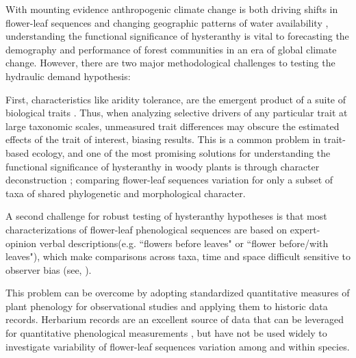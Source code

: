 \documentclass{article}\usepackage[]{graphicx}\usepackage[]{color}
\begin{document}

\noindent With mounting evidence anthropogenic climate change is both driving shifts in flower-leaf sequences \citep{Ma2020:aa} and changing geographic patterns of water availability \citep{Overpeck11856}, understanding the functional significance of hysteranthy is vital to forecasting the demography and performance of forest communities in an era of global climate change. However, there are two major methodological challenges to testing the hydraulic demand hypothesis:

\noindent First, characteristics like aridity tolerance, are the emergent product of a suite of biological traits \citep{Simova:2017vk}. Thus, when analyzing selective drivers of any particular trait at large taxonomic scales, unmeasured trait differences may obscure the estimated effects of the trait of interest, biasing results. %
This is a common problem in trait-based ecology, and one of the most promising solutions for understanding the functional significance of hysteranthy in woody plants is through character deconstruction \citep{Terribile2009}; comparing flower-leaf sequences variation for only a subset of taxa of shared phylogenetic and morphological character.   

\noindent A second challenge for robust testing of hysteranthy hypotheses is that most characterizations of flower-leaf phenological sequences are based on expert-opinion verbal descriptions(e.g. ``flowers before leaves" or ``flower before/with leaves"), which make comparisons across taxa, time and space difficult sensitive to observer bias (see, \citep{Buonaiuto2020}). 

\noindent This problem can be overcome by adopting standardized quantitative measures of plant phenology for observational studies and applying them to historic data records. Herbarium records are an excellent source of data that can be leveraged for quantitative phenological measurements \citep{Willis2017}, but have not be used widely to investigate variability of flower-leaf sequences variation among and within species.
\end{document}
